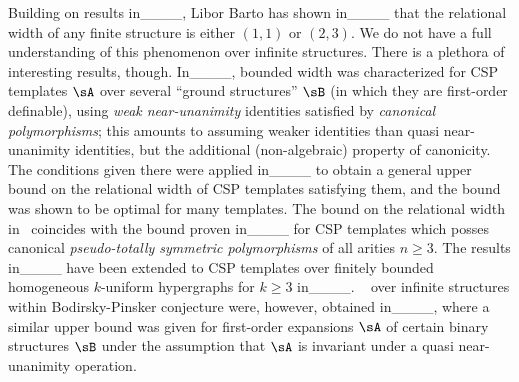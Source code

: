 Building on results in____, Libor Barto has shown in____ that the  relational width of any finite structure is either $(1,1)$ or $(2,3)$. We do not have a full understanding of this phenomenon over infinite structures. There is a plethora of interesting results, though.    
In____, bounded width was characterized for CSP templates $\sA$ over several ``ground structures'' $\sB$ (in which they are first-order definable), using \emph{weak near-unanimity} identities satisfied by \emph{canonical polymorphisms}; this amounts to assuming weaker identities than quasi near-unanimity identities, but the additional (non-algebraic) property of canonicity.
The conditions given there were applied  in____ to obtain a general  upper bound on the relational width of CSP templates satisfying them, and the bound was shown to be optimal for many templates. The bound on the relational width in~ coincides with the bound proven in____ for CSP templates which posses canonical \emph{pseudo-totally symmetric polymorphisms} of all arities $n\geq 3$. %
The results in____ have been extended to CSP templates over finitely bounded homogeneous $k$-uniform hypergraphs for  $k\geq 3$ in____.
~ over infinite structures within Bodirsky-Pinsker conjecture were, however, obtained in____, where a similar upper bound was given for first-order expansions $\sA$ of certain binary structures $\sB$  under the assumption that $\sA$ is invariant under  a quasi near-unanimity operation.%

